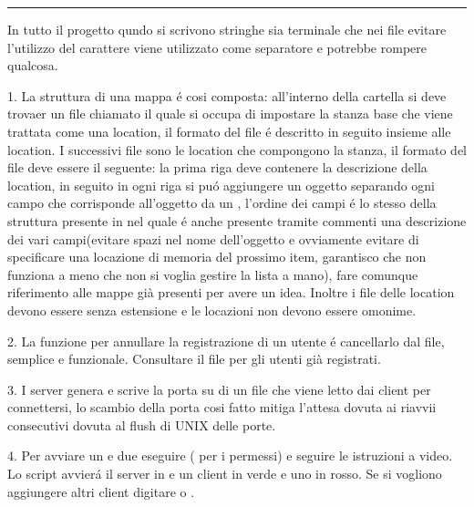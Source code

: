 \documentclass[12pt]{article}
\begin{document}
\par\noindent\rule{\textwidth}{0.1pt}
{
\footnotesize
In tutto il progetto qundo si scrivono stringhe sia terminale che nei file evitare l'utilizzo del carattere  viene utilizzato come separatore e potrebbe rompere qualcosa.

1. La struttura di una mappa é cosi composta: all'interno della cartella si deve trovaer un file chiamato  il quale si occupa di impostare la stanza base che viene trattata come una location, il formato del file é descritto in seguito insieme alle location. I successivi file sono le location che compongono la stanza, il formato del file deve essere il seguente: la prima riga deve contenere la descrizione della location, in seguito in ogni riga si puó aggiungere un oggetto separando ogni campo che corrisponde all'oggetto da un , l'ordine dei campi é lo stesso della struttura presente in  nel quale é anche presente tramite commenti una descrizione dei vari campi(evitare spazi nel nome dell'oggetto e ovviamente evitare di specificare una locazione di memoria del prossimo item, garantisco che non funziona a meno che non si voglia gestire la lista a mano), fare comunque riferimento alle mappe già presenti per avere un idea. Inoltre i file delle location devono essere senza estensione e le locazioni non devono essere omonime.

2. La funzione per annullare la registrazione di un utente é cancellarlo dal file, semplice e funzionale. Consultare il file  per gli utenti già registrati. 

3. I server genera e scrive la porta su di un file che viene letto dai client per connettersi, lo scambio della porta cosi fatto mitiga l'attesa dovuta ai riavvii consecutivi dovuta al flush di UNIX delle porte.

4. Per avviare un  e due  eseguire  ( per i permessi) e seguire le istruzioni a video. Lo script avvierá il server in  e un client in {\color{green}verde}  e uno in {\color{red}rosso}. Se si vogliono aggiungere altri client digitare  o .
}
\end{document}
